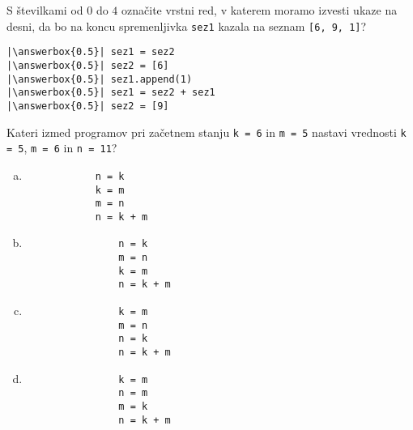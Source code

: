 \documentclass[arhiv, 10pt]{../izpit}
\newcommand{\inlinepy}[1]{\texttt{#1}}
\newcommand{\answerbox}[1]{\framebox{\vphantom{\large M}\hspace{#1cm}}}
\begin{document}
        \naloga*
        \begin{multicols}{2}
        \noindent 
        S številkami od $0$ do $4$ označite vrstni red, v katerem moramo izvesti ukaze na desni, da bo na koncu spremenljivka \inlinepy{sez1} kazala na seznam \inlinepy{[6, 9, 1]}?
    
        \columnbreak
        \noindent
        \begin{verbatim}
|\answerbox{0.5}| sez1 = sez2
|\answerbox{0.5}| sez2 = [6]
|\answerbox{0.5}| sez1.append(1)
|\answerbox{0.5}| sez1 = sez2 + sez1
|\answerbox{0.5}| sez2 = [9]

        \end{verbatim}
        \end{multicols}
    
            
        \naloga*
        
        Kateri izmed programov pri začetnem stanju
            \inlinepy{k = 6} in
            \inlinepy{m = 5}
        nastavi vrednosti
            \inlinepy{k = 5},
            \inlinepy{m = 6} in
            \inlinepy{n = 11}?
    
        \begin{multicols}{4}
        \begin{enumerate}[(a)]
\item 
            \begin{verbatim}
            n = k
            k = m
            m = n
            n = k + m
            \end{verbatim}
        
\item 
                \begin{verbatim}
                n = k
                m = n
                k = m
                n = k + m
                \end{verbatim}
            
\item 
                \begin{verbatim}
                k = m
                m = n
                n = k
                n = k + m
                \end{verbatim}
            
\item 
                \begin{verbatim}
                k = m
                n = m
                m = k
                n = k + m
                \end{verbatim}
            
\end{enumerate}

        \end{multicols}
    
\end{document}
